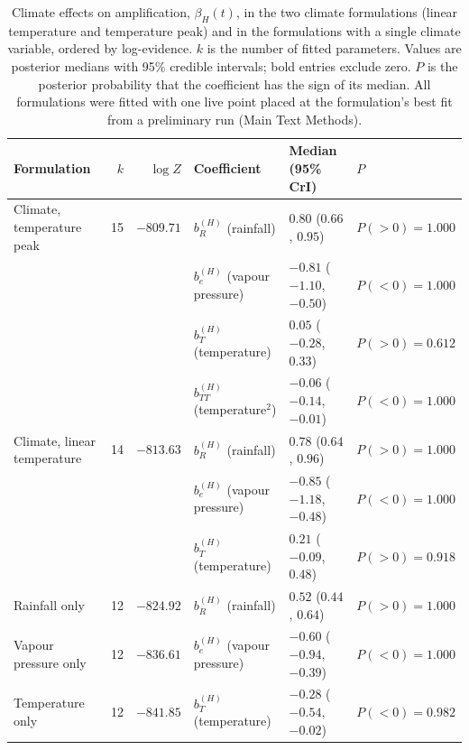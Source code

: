 \begin{table}[ht]
\centering
\small
\caption{Climate effects on amplification, $\beta_H(t)$, in the two climate formulations (linear temperature and temperature peak) and in the formulations with a single climate variable, ordered by log-evidence. $k$ is the number of fitted parameters. Values are posterior medians with 95\% credible intervals; bold entries exclude zero. $P$ is the posterior probability that the coefficient has the sign of its median. All formulations were fitted with one live point placed at the formulation's best fit from a preliminary run (Main Text Methods).}
\label{tab:si_amplification_coefficients}
\begin{tabular}{lrrlll}
\toprule
Formulation & $k$ & $\log Z$ & Coefficient & Median (95\% CrI) & $P$ \\
\midrule
Climate, temperature peak & 15 & $-809.71$ & $b_R^{(H)}$ (rainfall) & $\mathbf{0.80}$ ($0.66$, $0.95$) & $P(>0) = 1.000$ \\
 & & & $b_e^{(H)}$ (vapour pressure) & $\mathbf{-0.81}$ ($-1.10$, $-0.50$) & $P(<0) = 1.000$ \\
 & & & $b_T^{(H)}$ (temperature) & $0.05$ ($-0.28$, $0.33$) & $P(>0) = 0.612$ \\
 & & & $b_{TT}^{(H)}$ (temperature$^2$) & $\mathbf{-0.06}$ ($-0.14$, $-0.01$) & $P(<0) = 1.000$ \\
Climate, linear temperature & 14 & $-813.63$ & $b_R^{(H)}$ (rainfall) & $\mathbf{0.78}$ ($0.64$, $0.96$) & $P(>0) = 1.000$ \\
 & & & $b_e^{(H)}$ (vapour pressure) & $\mathbf{-0.85}$ ($-1.18$, $-0.48$) & $P(<0) = 1.000$ \\
 & & & $b_T^{(H)}$ (temperature) & $0.21$ ($-0.09$, $0.48$) & $P(>0) = 0.918$ \\
Rainfall only & 12 & $-824.92$ & $b_R^{(H)}$ (rainfall) & $\mathbf{0.52}$ ($0.44$, $0.64$) & $P(>0) = 1.000$ \\
Vapour pressure only & 12 & $-836.61$ & $b_e^{(H)}$ (vapour pressure) & $\mathbf{-0.60}$ ($-0.94$, $-0.39$) & $P(<0) = 1.000$ \\
Temperature only & 12 & $-841.85$ & $b_T^{(H)}$ (temperature) & $\mathbf{-0.28}$ ($-0.54$, $-0.02$) & $P(<0) = 0.982$ \\
\bottomrule
\end{tabular}
\end{table}
